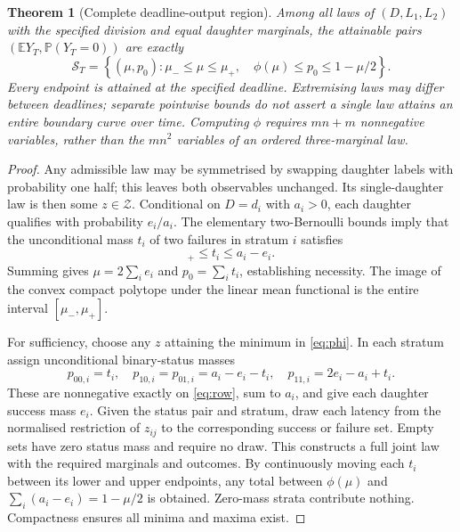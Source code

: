 \documentclass[11pt]{article}
\newtheorem{theorem}{Theorem}\newtheorem{proposition}[theorem]{Proposition}\newtheorem{corollary}[theorem]{Corollary}
\newcommand{\E}{\mathbb E}\newcommand{\Prb}{\mathbb P}\newcommand{\pos}[1]{\left[#1\right]_+}
\begin{document}
\begin{theorem}[Complete deadline-output region]\label{thm:main}
Among all laws of $(D,L_1,L_2)$ with the specified division and equal daughter marginals, the attainable pairs $(\E Y_T,\Prb(Y_T=0))$ are exactly
\begin{equation}
 \mathcal S_T=\left\{(\mu,p_0):\mu_-\leq\mu\leq\mu_+,\quad
 \phi(\mu)\leq p_0\leq1-\mu/2\right\}.
 \label{eq:region}
\end{equation}
Every endpoint is attained at the specified deadline. Extremising laws may differ between deadlines; separate pointwise bounds do not assert a single law attains an entire boundary curve over time. Computing $\phi$ requires $mn+m$ nonnegative variables, rather than the $mn^2$ variables of an ordered three-marginal law.
\end{theorem}
\begin{proof}
Any admissible law may be symmetrised by swapping daughter labels with probability one half; this leaves both observables unchanged. Its single-daughter law is then some $z\in\mathcal Z$. Conditional on $D=d_i$ with $a_i>0$, each daughter qualifies with probability $e_i/a_i$. The elementary two-Bernoulli bounds imply that the unconditional mass $t_i$ of two failures in stratum $i$ satisfies
\begin{equation}
 [a_i-2e_i]_+\leq t_i\leq a_i-e_i.\label{eq:row}
\end{equation}
Summing gives $\mu=2\sum_i e_i$ and $p_0=\sum_i t_i$, establishing necessity. The image of the convex compact polytope under the linear mean functional is the entire interval $[\mu_-,\mu_+]$.

For sufficiency, choose any $z$ attaining the minimum in \eqref{eq:phi}. In each stratum assign unconditional binary-status masses
\[
 p_{00,i}=t_i,\quad p_{10,i}=p_{01,i}=a_i-e_i-t_i,\quad
 p_{11,i}=2e_i-a_i+t_i.
\]
These are nonnegative exactly on \eqref{eq:row}, sum to $a_i$, and give each daughter success mass $e_i$. Given the status pair and stratum, draw each latency from the normalised restriction of $z_{ij}$ to the corresponding success or failure set. Empty sets have zero status mass and require no draw. This constructs a full joint law with the required marginals and outcomes. By continuously moving each $t_i$ between its lower and upper endpoints, any total between $\phi(\mu)$ and $\sum_i(a_i-e_i)=1-\mu/2$ is obtained. Zero-mass strata contribute nothing. Compactness ensures all minima and maxima exist.
\end{proof}
\end{document}
